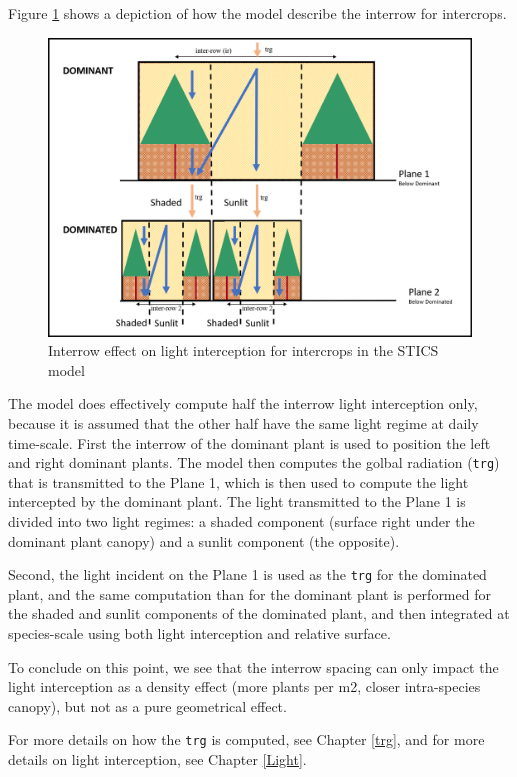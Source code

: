 \documentclass[]{book}
\theoremstyle{definition}
\theoremstyle{definition}
\theoremstyle{definition}
\theoremstyle{remark}
\begin{document}
Figure \ref{fig:interrow} shows a depiction of how the model describe
the interrow for intercrops.

\begin{figure}
\centering
\includegraphics{img/Interrow.png}
\caption{\label{fig:interrow}Interrow effect on light interception for
intercrops in the STICS model}
\end{figure}

The model does effectively compute half the interrow light interception
only, because it is assumed that the other half have the same light
regime at daily time-scale. First the interrow of the dominant plant is
used to position the left and right dominant plants. The model then
computes the golbal radiation (\texttt{trg}) that is transmitted to the
Plane 1, which is then used to compute the light intercepted by the
dominant plant. The light transmitted to the Plane 1 is divided into two
light regimes: a shaded component (surface right under the dominant
plant canopy) and a sunlit component (the opposite).

Second, the light incident on the Plane 1 is used as the \texttt{trg}
for the dominated plant, and the same computation than for the dominant
plant is performed for the shaded and sunlit components of the dominated
plant, and then integrated at species-scale using both light
interception and relative surface.

To conclude on this point, we see that the interrow spacing can only
impact the light interception as a density effect (more plants per m2,
closer intra-species canopy), but not as a pure geometrical effect.

For more details on how the \texttt{trg} is computed, see Chapter
\ref{trg}, and for more details on light interception, see Chapter
\ref{Light}.
\end{document}
